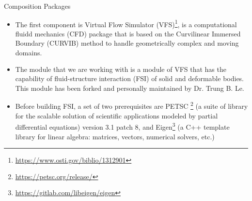 \documentclass[\string~/GitHub/sthlmNordBeamerTheme/sthlmNordLightDemo.tex]{subfiles}
\begin{document}
\begin{frame}[c]{Composition Packages}

    \begin{itemize}
		
            \item The first component is Virtual Flow Simulator (VFS)\footnote{\url{https://www.osti.gov/biblio/1312901}}, is a computational fluidd mechanics (CFD) package that is based on the Curvilinear Immersed Boundary (CURVIB) method to handle geometrically complex and moving domains. 
            
            \item The module that we are working with is a module of VFS that has the capability of fluid-structure interaction (FSI) of solid and deformable bodies. This module has been forked and personally maintained by Dr. Trung B. Le.
		
            \item Before building FSI, a set of two prerequisites are PETSC \footnote{\url{https://petsc.org/release/}} (a suite of library for the scalable solution of scientific applications modeled by partial differential equations) version 3.1 patch 8, and Eigen\footnote{\url{https://gitlab.com/libeigen/eigen}} (a C++ template library for linear algebra: matrices, vectors, numerical solvers, etc.)
            
    \end{itemize}
 
\end{frame}
\end{document}
